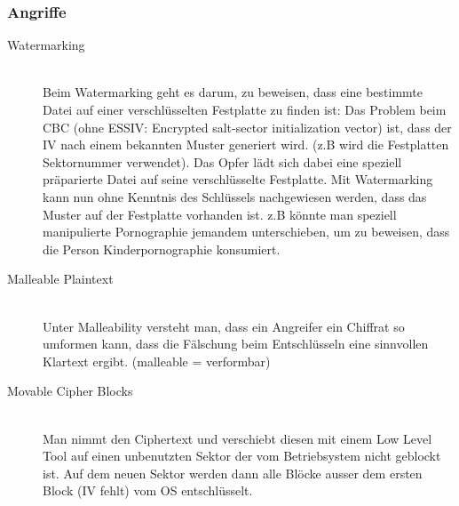 \subsubsection{Angriffe}
\begin{description}
	\item[Watermarking] \hfill \\
	Beim Watermarking geht es darum, zu beweisen, dass eine bestimmte Datei auf einer verschlüsselten Festplatte zu finden ist: Das Problem beim CBC (ohne ESSIV: Encrypted salt-sector initialization vector) ist, dass der IV nach einem bekannten Muster generiert wird. (z.B wird die Festplatten Sektornummer verwendet). Das Opfer lädt sich dabei eine speziell präparierte Datei auf seine verschlüsselte Festplatte. Mit Watermarking kann nun ohne Kenntnis des Schlüssels nachgewiesen werden, dass das Muster auf der Festplatte vorhanden ist. z.B könnte man speziell manipulierte Pornographie jemandem unterschieben, um zu beweisen, dass die Person Kinderpornographie konsumiert.
	\item[Malleable Plaintext] \hfill \\
	Unter Malleability versteht man, dass ein Angreifer ein Chiffrat so umformen kann, dass die Fälschung beim Entschlüsseln eine sinnvollen Klartext ergibt. (malleable = verformbar) 
	\item[Movable Cipher Blocks] \hfill \\
	Man nimmt den Ciphertext und verschiebt diesen mit einem Low Level Tool auf einen unbenutzten Sektor der vom Betriebsystem nicht geblockt ist. Auf dem neuen Sektor werden dann alle Blöcke ausser dem ersten Block (IV fehlt) vom OS entschlüsselt.
\end{description}

